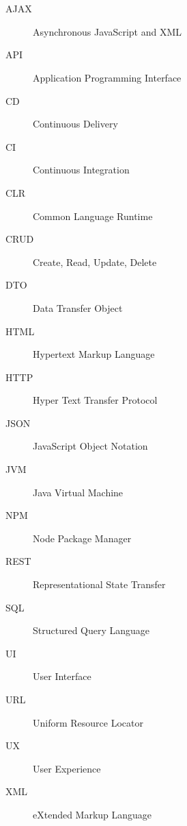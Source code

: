 \chapter*{\SeznamZkratek}

\begin{multicols}{2}
\raggedright
\begin{description}
\item [AJAX] Asynchronous JavaScript and XML
\item [API] Application Programming Interface
\item [CD] Continuous Delivery
\item [CI] Continuous Integration
\item [CLR] Common Language Runtime
\item [CRUD] Create, Read, Update, Delete
\item [DTO] Data Transfer Object
\item [HTML] Hypertext Markup Language
\item [HTTP] Hyper Text Transfer Protocol
\item [JSON] JavaScript Object Notation
\item [JVM] Java Virtual Machine
\item [NPM] Node Package Manager
\item [REST] Representational State Transfer
\item [SQL] Structured Query Language
\item [UI] User Interface
\item [URL] Uniform Resource Locator
\item [UX] User Experience
\item [XML] eXtended Markup Language
\end{description}
\end{multicols}

